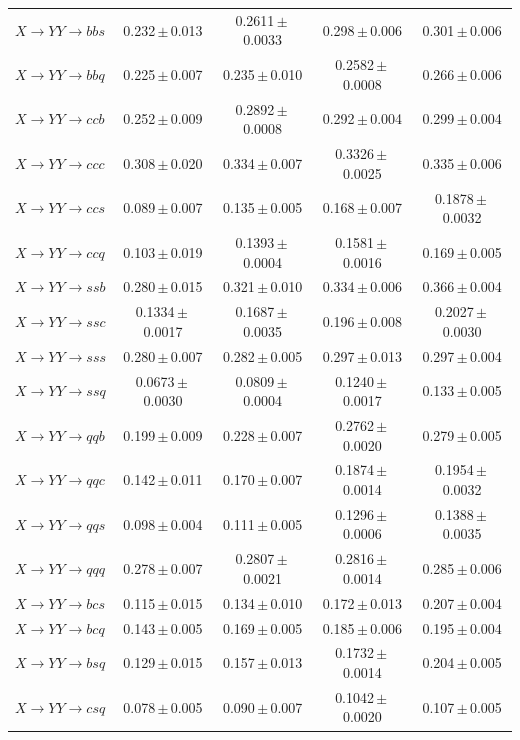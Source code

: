 \begin{landscape}
{\begin{longtable}{@{\extracolsep{\fill}}lcccc@{}}
$X\to YY\to bbs$ & 0.232\,$\pm$\,0.013 & 0.2611\,$\pm$\,0.0033 & 0.298\,$\pm$\,0.006 & 0.301\,$\pm$\,0.006 \\
$X\to YY\to bbq$ & 0.225\,$\pm$\,0.007 & 0.235\,$\pm$\,0.010 & 0.2582\,$\pm$\,0.0008 & 0.266\,$\pm$\,0.006 \\
$X\to YY\to ccb$ & 0.252\,$\pm$\,0.009 & 0.2892\,$\pm$\,0.0008 & 0.292\,$\pm$\,0.004 & 0.299\,$\pm$\,0.004 \\
$X\to YY\to ccc$ & 0.308\,$\pm$\,0.020 & 0.334\,$\pm$\,0.007 & 0.3326\,$\pm$\,0.0025 & 0.335\,$\pm$\,0.006 \\
$X\to YY\to ccs$ & 0.089\,$\pm$\,0.007 & 0.135\,$\pm$\,0.005 & 0.168\,$\pm$\,0.007 & 0.1878\,$\pm$\,0.0032 \\
$X\to YY\to ccq$ & 0.103\,$\pm$\,0.019 & 0.1393\,$\pm$\,0.0004 & 0.1581\,$\pm$\,0.0016 & 0.169\,$\pm$\,0.005 \\
$X\to YY\to ssb$ & 0.280\,$\pm$\,0.015 & 0.321\,$\pm$\,0.010 & 0.334\,$\pm$\,0.006 & 0.366\,$\pm$\,0.004 \\
$X\to YY\to ssc$ & 0.1334\,$\pm$\,0.0017 & 0.1687\,$\pm$\,0.0035 & 0.196\,$\pm$\,0.008 & 0.2027\,$\pm$\,0.0030 \\
$X\to YY\to sss$ & 0.280\,$\pm$\,0.007 & 0.282\,$\pm$\,0.005 & 0.297\,$\pm$\,0.013 & 0.297\,$\pm$\,0.004 \\
$X\to YY\to ssq$ & 0.0673\,$\pm$\,0.0030 & 0.0809\,$\pm$\,0.0004 & 0.1240\,$\pm$\,0.0017 & 0.133\,$\pm$\,0.005 \\
$X\to YY\to qqb$ & 0.199\,$\pm$\,0.009 & 0.228\,$\pm$\,0.007 & 0.2762\,$\pm$\,0.0020 & 0.279\,$\pm$\,0.005 \\
$X\to YY\to qqc$ & 0.142\,$\pm$\,0.011 & 0.170\,$\pm$\,0.007 & 0.1874\,$\pm$\,0.0014 & 0.1954\,$\pm$\,0.0032 \\
$X\to YY\to qqs$ & 0.098\,$\pm$\,0.004 & 0.111\,$\pm$\,0.005 & 0.1296\,$\pm$\,0.0006 & 0.1388\,$\pm$\,0.0035 \\
$X\to YY\to qqq$ & 0.278\,$\pm$\,0.007 & 0.2807\,$\pm$\,0.0021 & 0.2816\,$\pm$\,0.0014 & 0.285\,$\pm$\,0.006 \\
$X\to YY\to bcs$ & 0.115\,$\pm$\,0.015 & 0.134\,$\pm$\,0.010 & 0.172\,$\pm$\,0.013 & 0.207\,$\pm$\,0.004 \\
$X\to YY\to bcq$ & 0.143\,$\pm$\,0.005 & 0.169\,$\pm$\,0.005 & 0.185\,$\pm$\,0.006 & 0.195\,$\pm$\,0.004 \\
$X\to YY\to bsq$ & 0.129\,$\pm$\,0.015 & 0.157\,$\pm$\,0.013 & 0.1732\,$\pm$\,0.0014 & 0.204\,$\pm$\,0.005 \\
$X\to YY\to csq$ & 0.078\,$\pm$\,0.005 & 0.090\,$\pm$\,0.007 & 0.1042\,$\pm$\,0.0020 & 0.107\,$\pm$\,0.005 \\

\end{longtable}}
\end{landscape}
